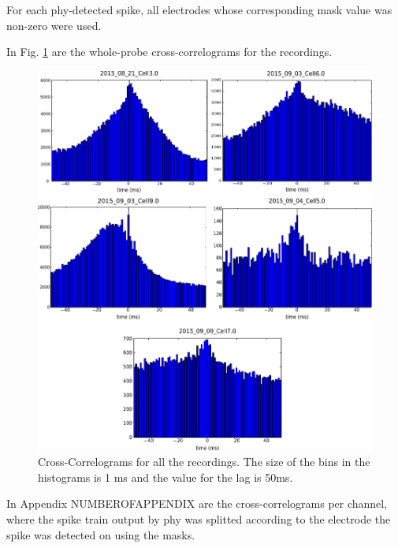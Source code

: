 \documentclass{article}
\begin{document}
For each phy-detected spike, all electrodes whose corresponding mask value was non-zero were used.

In Fig. \ref{fig:CC} are the whole-probe cross-correlograms for the recordings.

\begin{figure}[!h]
	\centering
	\includegraphics[width=\linewidth]{CC.pdf}
	\caption{Cross-Correlograms for all the recordings. The size of the bins in the histograms is 1 ms and the value for the lag is 50ms.
}
\label{fig:CC}
\end{figure}

In Appendix NUMBEROFAPPENDIX are the cross-correlograms per channel, where the spike train output by phy was splitted according to the electrode the spike was detected on using the masks.
\end{document}

